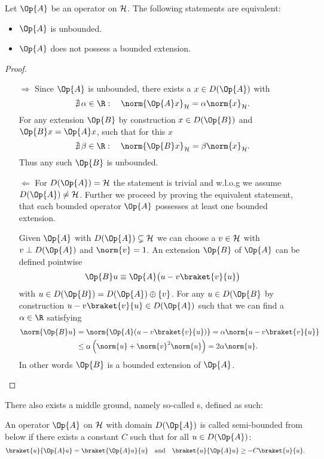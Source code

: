 \begin{prop}
	Let $\Op{A}$ be an operator on $\mathcal{H}$.
	The following statements are equivalent:
	\begin{itemize}
		\item $\Op{A}$ is unbounded.
		\item $\Op{A}$ does not possess a bounded extension.
	\end{itemize}
	\begin{proof} ~
		\begin{itemize}
			\item[$\Rightarrow$] Since $\Op{A}$ is unbounded,
				there exists a $x \in D(\Op{A})$ with
				\[ \nexists \, \alpha \in \R: \quad \norm{\Op{A} x}_\hilbert = \alpha \norm{x}_{\hilbert}. \]
				For any extension $\Op{B}$ by construction $x \in D(\Op{B})$ and
				$\Op{B} x = \Op{A} x$, such that for this $x$
				\[ \nexists \, \beta\in \R: \quad \norm{\Op{B} x}_\hilbert = \beta \norm{x}_{\hilbert}. \]
				Thus any such $\Op{B}$ is unbounded.
			\item[$\Leftarrow$]
				For  $D(\Op{A}) = \hilbert$ the statement is trivial
				and w.l.o.g we assume $D(\Op{A}) \neq \hilbert$.
				Further we proceed by
				proving the equivalent statement,
				that each bounded operator
				$\Op{A}$ possesses at least one bounded extension.

				Given $\Op{A}$ with $D(\Op{A}) \subsetneq \hilbert$ we can choose a $v \in \mathcal{H}$
				with $v \perp D(\Op{A})$ and $\norm{v} = 1$.
				An extension $\Op{B}$ of $\Op{A}$ can be defined pointwise
				\[ \Op{B} u \equiv \Op{A} \big(u - v \braket{v}{u}\big) \]
				with $u \in D(\Op{B}) = D(\Op{A}) \oplus \{v\}$.
				For any $u \in D(\Op{B}$ by construction
				$u - v \braket{v}{u} \in D(\Op{A})$
				such that we can find a $\alpha \in \R$ satisfying
				\begin{align*}
					\norm{\Op{B} u}
					&= \norm{\Op{A} (u - v \braket{v}{u})}
					= \alpha \norm{u - v \braket{v}{u}} \\
					&\leq \alpha \left(\norm{u} + \norm{v}^2 \norm{u} \right)
					= 2 \alpha \norm{u}.
				\end{align*}
				In other words $\Op{B}$ is a bounded extension of $\Op{A}$.
		\end{itemize}
	\end{proof}
\end{prop}

There also exists a middle ground,
namely so-called s, defined as such:
\begin{defn}
	\label{defn:SemiBounded}
	An operator $\Op{A}$ on $\mathcal{H}$ with domain $D(\Op{A})$
	is called semi-bounded from below if there exists a constant $C$
	such that for all $u \in D(\Op{A})$:
	\[ \braket{u}{\Op{A} u} = \braket{\Op{A} u}{u} \quad \text{and}
	\quad \braket{u}{\Op{A} u} \geq -C \braket{u}{u}. \]
\end{defn}

